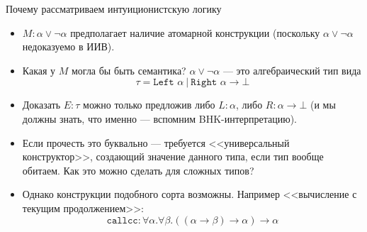 \documentclass[aspectratio=169]{beamer}
\begin{document}
\begin{frame}{Почему рассматриваем интуиционистскую логику}
\begin{itemize}
\item $M: \alpha\vee\neg\alpha$ предполагает наличие атомарной конструкции (поскольку $\alpha\vee\neg\alpha$ недоказуемо в ИИВ).
\item Какая у $M$ могла бы быть семантика? $\alpha\vee\neg\alpha$ --- это алгебраический тип вида $$\tau = \texttt{Left }\alpha\ |\ \texttt{Right }\alpha\rightarrow\bot$$
\item Доказать $E:\tau$ можно только предложив либо $L: \alpha$, либо $R : \alpha\rightarrow\bot$ (и мы должны знать, что именно --- вспомним
BHK-интерпретацию).
\item Если прочесть это буквально --- требуется <<универсальный конструктор>>,
создающий значение данного типа, если тип вообще обитаем. Как это можно сделать
для сложных типов?
\item Однако конструкции подобного сорта возможны. Например <<вычисление с текущим продолжением>>:
$$\texttt{callcc}: \forall\alpha.\forall\beta.((\alpha\rightarrow\beta)\rightarrow\alpha)\rightarrow\alpha$$
\end{itemize}
\end{frame}

\end{document}
